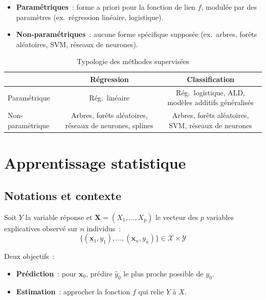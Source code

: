 \documentclass[a4paper,11pt]{article}
\theoremstyle{definition}
\theoremstyle{remark}
\begin{document}
\begin{itemize}
  \item \textbf{Param\'etriques}~: forme a priori pour la fonction
    de lien $f$, modul\'ee par des param\`etres
    (ex.~r\'egression lin\'eaire, logistique).
  \item \textbf{Non-param\'etriques}~: aucune forme sp\'ecifique
    suppos\'ee (ex.~arbres, for\^ets al\'eatoires, SVM, r\'eseaux
    de neurones).
\end{itemize}

\begin{table}[h]
\centering
\caption{Typologie des m\'ethodes supervis\'ees}
\begin{tabular}{lcc}
\toprule
& R\'egression & Classification \\
\midrule
Param\'etrique
  & R\'eg.~lin\'eaire
  & R\'eg.~logistique, ALD, mod\`eles additifs g\'en\'eralis\'es \\
Non-param\'etrique
  & Arbres, for\^ets al\'eatoires, r\'eseaux de neurones, splines
  & Arbres, for\^ets al\'eatoires, SVM, r\'eseaux de neurones \\
\bottomrule
\end{tabular}
\end{table}

\section{Apprentissage statistique}

\subsection{Notations et contexte}

Soit $Y$ la variable r\'eponse et
$\mathbf{X} = (X_1,\dots,X_p)$ le vecteur des $p$ variables
explicatives observ\'e sur $n$ individus~:
\[
\{(\mathbf{x}_1, y_1), \dots, (\mathbf{x}_n, y_n)\}
\in \mathcal{X} \times \mathcal{Y}
\]

\noindent Deux objectifs~:
\begin{itemize}
  \item \textbf{Pr\'ediction}~: pour $\mathbf{x}_0$,
    pr\'edire $\hat{y}_0$ le plus proche possible de $y_0$.
  \item \textbf{Estimation}~: approcher la fonction $f$ qui relie
    $Y$ \`a $X$.
\end{itemize}
\end{document}

